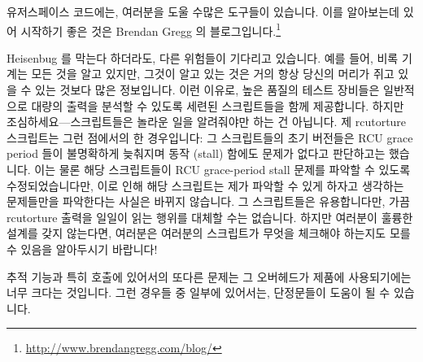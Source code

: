 유저스페이스 코드에는, 여러분을 도울 수많은 도구들이 있습니다.
이를 알아보는데 있어 시작하기 좋은 것은 Brendan Gregg 의
블로그입니다.\footnote{
	\url{http://www.brendangregg.com/blog/}}

Heisenbug 를 막는다 하더라도, 다른 위험들이 기다리고 있습니다.
예를 들어, 비록 기계는 모든 것을 알고 있지만, 그것이 알고 있는 것은 거의 항상
당신의 머리가 쥐고 있을 수 있는 것보다 많은 정보입니다.
이런 이유로, 높은 품질의 테스트 장비들은 일반적으로 대량의 출력을 분석할 수
있도록 세련된 스크립트들을 함께 제공합니다.
하지만 조심하세요---스크립트들은 놀라운 일을 알려줘야만 하는 건 아닙니다.
제 rcutorture 스크립트는 그런 점에서의 한 경우입니다: 그 스크립트들의 초기
버전들은 RCU grace period 들이 불명확하게 늦춰지며 동작 (stall) 함에도 문제가
없다고 판단하고는 했습니다.
이는 물론 해당 스크립트들이 RCU grace-period stall 문제를 파악할 수 있도록
수정되었습니다만, 이로 인해 해당 스크립트는 제가 파악할 수 있게 하자고 생각하는
문제들만을 파악한다는 사실은 바뀌지 않습니다.
그 스크립트들은 유용합니다만, 가끔 rcutorture 출력을 일일이 읽는 행위를 대체할
수는 없습니다.
하지만 여러분이 훌륭한 설계를 갖지 않는다면, 여러분은 여러분의 스크립트가
무엇을 체크해야 하는지도 모를 수 있음을 알아두시기 바랍니다!

추적 기능과 특히  호출에 있어서의 또다른 문제는 그 오버헤드가
제품에 사용되기에는 너무 크다는 것입니다.
그런 경우들 중 일부에 있어서는, 단정문들이 도움이 될 수 있습니다.

